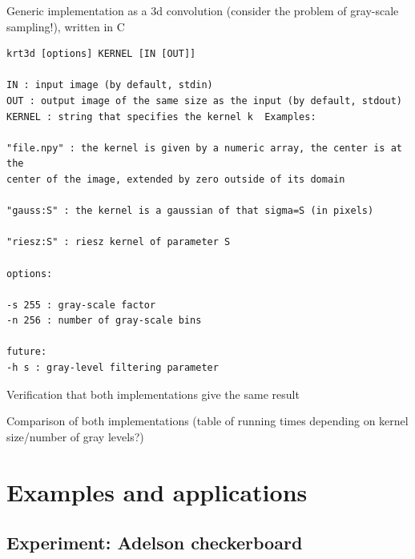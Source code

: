 \documentclass[12pt]{article}                  %
\begin{document}
Generic implementation as a 3d convolution (consider the problem of
gray-scale sampling!), written in C

{\small
\begin{verbatim}
krt3d [options] KERNEL [IN [OUT]]

IN : input image (by default, stdin)
OUT : output image of the same size as the input (by default, stdout)
KERNEL : string that specifies the kernel k  Examples:

"file.npy" : the kernel is given by a numeric array, the center is at the
center of the image, extended by zero outside of its domain

"gauss:S" : the kernel is a gaussian of that sigma=S (in pixels)

"riesz:S" : riesz kernel of parameter S

options:

-s 255 : gray-scale factor
-n 256 : number of gray-scale bins

future:
-h s : gray-level filtering parameter

\end{verbatim}
}

Verification that both implementations give the same result

Comparison of both implementations (table of running times depending on
kernel size/number of gray levels?)

\section{Examples and applications}

\subsection{Experiment: Adelson checkerboard }

\end{document}
